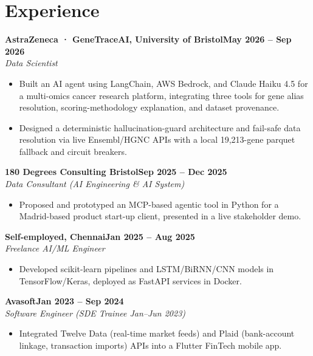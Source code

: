 \documentclass[a4paper,10pt]{article}
\newcommand{\entry}[4]{\noindent\textbf{#1}\hfill\textbf{#2}\\ \textit{#3}\hfill\textit{#4}\par}
\begin{document}
\section{Experience}
\entry{AstraZeneca · GeneTraceAI, University of Bristol}{May 2026 – Sep 2026}{Data Scientist}{}
\begin{itemize}
  \item Built an AI agent using LangChain, AWS Bedrock, and Claude Haiku 4.5 for a multi-omics cancer research platform, integrating three tools for gene alias resolution, scoring-methodology explanation, and dataset provenance.
  \item Designed a deterministic hallucination-guard architecture and fail-safe data resolution via live Ensembl/HGNC APIs with a local 19,213-gene parquet fallback and circuit breakers.
\end{itemize}
\vspace{3pt}
\entry{180 Degrees Consulting Bristol}{Sep 2025 – Dec 2025}{Data Consultant (AI Engineering \& AI System)}{}
\begin{itemize}
  \item Proposed and prototyped an MCP-based agentic tool in Python for a Madrid-based product start-up client, presented in a live stakeholder demo.
\end{itemize}
\vspace{3pt}
\entry{Self-employed, Chennai}{Jan 2025 – Aug 2025}{Freelance AI/ML Engineer}{}
\begin{itemize}
  \item Developed scikit-learn pipelines and LSTM/BiRNN/CNN models in TensorFlow/Keras, deployed as FastAPI services in Docker.
\end{itemize}
\vspace{3pt}
\entry{Avasoft}{Jan 2023 – Sep 2024}{Software Engineer (SDE Trainee Jan–Jun 2023)}{}
\begin{itemize}
  \item Integrated Twelve Data (real-time market feeds) and Plaid (bank-account linkage, transaction imports) APIs into a Flutter FinTech mobile app.
\end{itemize}

\end{document}
